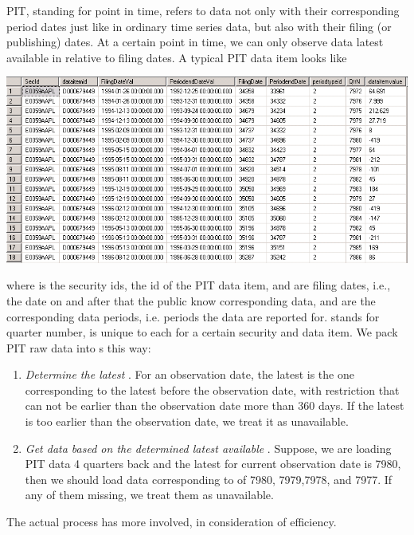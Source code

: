 \nopagebreak
{}
\begin{parchment}
\small\sffamily
PIT, standing for point in time, refers to data not only with their corresponding period dates just like in ordinary time series data,
but also with their filing (or publishing) dates.
At a certain point in time,
we can only observe data latest available in relative to filing dates.
A typical PIT data item looks like
\begin{center}
\includegraphics[width=\textwidth]{pit.png}
\end{center}
where  is the security ids,
 the id of the PIT data item,
 and  are filing dates,
i.e., the date on and after that the public know corresponding data,
 and  are the corresponding data periods,
i.e. periods the data are reported for.
 stands for quarter number,
is unique to each  for a certain security and data item.
We pack PIT raw data into \myfints{}s this way:
\begin{enumerate}
  \item \emph{Determine the latest} .
        For an observation date, 
        the latest  is the one corresponding to the latest  before the observation date,
        with restriction that  can not be earlier than the observation date more than 360 days.
        If the latest  is too earlier than the observation date, 
        we treat it as unavailable.
  \item \emph{Get data based on the determined latest available} .
        Suppose, we are loading PIT data 4 quarters back and the latest  for current observation date
        is 7980, then we should load data corresponding to  of 7980, 7979,7978, and 7977.
        If any of them missing, we treat them as unavailable.
\end{enumerate}

The actual process has more involved, in consideration of efficiency.

\end{parchment}


